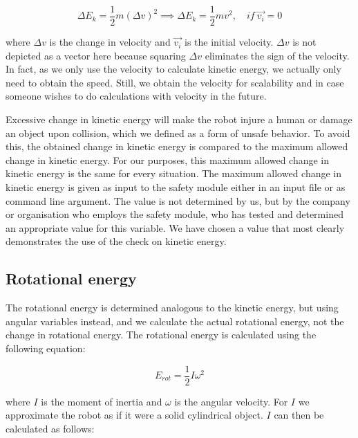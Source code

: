 \documentclass[12pt]{scrreprt}
\begin{document}
\begin{equation} \label{eq:change_ke}
    \Delta E_k = \frac{1}{2}m(\Delta v)^2 \implies \Delta E_k = \frac{1}{2}mv^2,\quad if\ \vec{v_i} = 0
\end{equation}

where $\Delta v$ is the change in velocity and $\vec{v_i}$ is the initial velocity. $\Delta v$ is not depicted as a vector here because squaring $\Delta v$ eliminates the sign of the velocity. In fact, as we only use the velocity to calculate kinetic energy, we actually only need to obtain the speed. Still, we obtain the velocity for scalability and in case someone wishes to do calculations with velocity in the future. 
\par
Excessive change in kinetic energy will make the robot injure a human or damage an object upon collision, which we defined as a form of unsafe behavior. To avoid this, the obtained change in kinetic energy is compared to the maximum allowed change in kinetic energy. For our purposes, this maximum allowed change in kinetic energy is the same for every situation. The maximum allowed change in kinetic energy is given as input to the safety module either in an input file or as command line argument. The value is not determined by us, but by the company or organisation who employs the safety module, who has tested and determined an appropriate value for this variable. We have chosen a value that most clearly demonstrates the use of the check on kinetic energy.

\subsection{Rotational energy}
\label{Rotational energy}
The rotational energy is determined analogous to the kinetic energy, but using angular variables instead, and we calculate the actual rotational energy, not the change in rotational energy. The rotational energy is calculated using the following equation:

\begin{equation} \label{eq:rot_energy}
    E_{rot} = \frac{1}{2}I\omega^2
\end{equation}

where $I$ is the moment of inertia and $\omega$ is the angular velocity. For $I$ we approximate the robot as if it were a solid cylindrical object. $I$ can then be calculated as follows:
\end{document}
